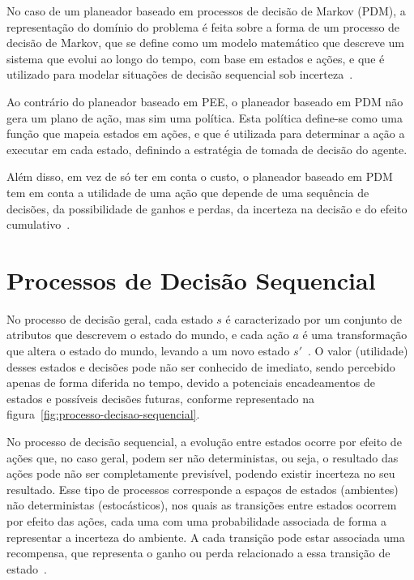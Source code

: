 No caso de um planeador baseado em processos de decisão de Markov (PDM), a representação do domínio do problema é feita sobre a forma de um processo de decisão de Markov, que se define como um modelo matemático que descreve um sistema que evolui ao longo do tempo, com base em estados e ações, e que é utilizado para modelar situações de decisão sequencial sob incerteza~\cite{isel:iasa:slides:plan-autom-pdm}.

Ao contrário do planeador baseado em PEE, o planeador baseado em PDM não gera um plano de ação, mas sim uma política.
Esta política define-se como uma função que mapeia estados em ações, e que é utilizada para determinar a ação a executar em cada estado, definindo a estratégia de tomada de decisão do agente.

Além disso, em vez de só ter em conta o custo, o planeador baseado em PDM tem em conta a utilidade de uma ação que depende de uma sequência de decisões, da possibilidade de ganhos e perdas, da incerteza na decisão e do efeito cumulativo~\cite{isel:iasa:slides:processos-decisao-sequencial}.


\section{Processos de Decisão Sequencial}\label{sec:processos-de-decisao-sequencial}

No processo de decisão geral, cada estado $s$ é caracterizado por um conjunto de atributos que descrevem o estado do mundo, e cada ação $a$ é uma transformação que altera o estado do mundo, levando a um novo estado $s'$~\cite{isel:iasa:slides:processos-decisao-sequencial}.
O valor (utilidade) desses estados e decisões pode não ser conhecido de imediato, sendo percebido apenas de forma diferida no tempo, devido a potenciais encadeamentos de estados e possíveis decisões futuras, conforme representado na figura~\ref{fig:processo-decisao-sequencial}.

No processo de decisão sequencial, a evolução entre estados ocorre por efeito de ações que, no caso geral, podem ser não deterministas, ou seja, o resultado das ações pode não ser completamente previsível, podendo existir incerteza no seu resultado.
Esse tipo de processos corresponde a espaços de estados (ambientes) não deterministas (estocásticos), nos quais as transições entre estados ocorrem por efeito das ações, cada uma com uma probabilidade associada de forma a representar a incerteza do ambiente. A cada transição pode estar associada uma recompensa, que representa o ganho ou perda relacionado a essa transição de estado~\cite{isel:iasa:slides:processos-decisao-sequencial}.


